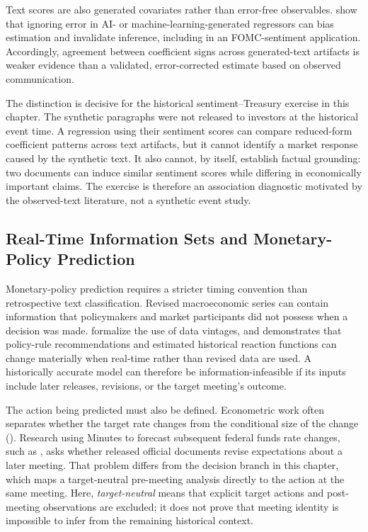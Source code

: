 Text scores are also generated covariates rather than error-free observables.
\citet{christensen2026valid} show that ignoring error in AI- or
machine-learning-generated regressors can bias estimation and invalidate
inference, including in an FOMC-sentiment application. Accordingly, agreement
between coefficient signs across generated-text artifacts is weaker evidence
than a validated, error-corrected estimate based on observed communication.

The distinction is decisive for the historical sentiment--Treasury exercise
in this chapter. The synthetic paragraphs were not released to investors at
the historical event time. A regression using their sentiment scores can
compare reduced-form coefficient patterns across text artifacts, but it cannot
identify a market response caused by the synthetic text. It also cannot, by
itself, establish factual grounding: two documents can induce similar
sentiment scores while differing in economically important claims. The
exercise is therefore an association diagnostic motivated by the observed-text
literature, not a synthetic event study.

\subsection{Real-Time Information Sets and Monetary-Policy Prediction}
\label{ch2:sec:lr:realtime}

Monetary-policy prediction requires a stricter timing convention than
retrospective text classification. Revised macroeconomic series can contain
information that policymakers and market participants did not possess when a
decision was made. \citet{croushore2001realtime} formalize the use of data
vintages, and \citet{orphanides2001monetary} demonstrates that policy-rule
recommendations and estimated historical reaction functions can change
materially when real-time rather than revised data are used. A historically
accurate model can therefore be information-infeasible if its inputs include
later releases, revisions, or the target meeting's outcome.

The action being predicted must also be defined. Econometric work often
separates whether the target rate changes from the conditional size of the
change (\cite{hamiltonjorda2002target}). Research using Minutes to forecast
subsequent federal funds rate changes, such as \citet{jung2016minutes}, asks
whether released official documents revise expectations about a later
meeting. That problem differs from the decision branch in this chapter, which
maps a target-neutral pre-meeting analysis directly to the action at the same
meeting. Here, \emph{target-neutral} means that explicit target actions and
post-meeting observations are excluded; it does not prove that meeting
identity is impossible to infer from the remaining historical context.

